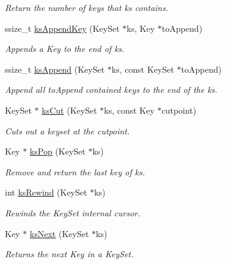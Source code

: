 \begin{DoxyCompactItemize}
\begin{DoxyCompactList}\small\item\em Return the number of keys that {\ttfamily ks} contains. \end{DoxyCompactList}\item 
ssize\+\_\+t \hyperlink{group__keyset_gaa5a1d467a4d71041edce68ea7748ce45}{ks\+Append\+Key} (Key\+Set $\ast$ks, Key $\ast$to\+Append)
\begin{DoxyCompactList}\small\item\em Appends a Key to the end of {\ttfamily ks}. \end{DoxyCompactList}\item 
ssize\+\_\+t \hyperlink{group__keyset_ga21eb9c3a14a604ee3a8bdc779232e7b7}{ks\+Append} (Key\+Set $\ast$ks, const Key\+Set $\ast$to\+Append)
\begin{DoxyCompactList}\small\item\em Append all {\ttfamily to\+Append} contained keys to the end of the {\ttfamily ks}. \end{DoxyCompactList}\item 
Key\+Set $\ast$ \hyperlink{group__keyset_ga6b00cf82b59af4d883a9bad6cf4a4a4a}{ks\+Cut} (Key\+Set $\ast$ks, const Key $\ast$cutpoint)
\begin{DoxyCompactList}\small\item\em Cuts out a keyset at the cutpoint. \end{DoxyCompactList}\item 
Key $\ast$ \hyperlink{group__keyset_gae42530b04defb772059de0600159cf69}{ks\+Pop} (Key\+Set $\ast$ks)
\begin{DoxyCompactList}\small\item\em Remove and return the last key of {\ttfamily ks}. \end{DoxyCompactList}\item 
int \hyperlink{group__keyset_gabe793ff51f1728e3429c84a8a9086b70}{ks\+Rewind} (Key\+Set $\ast$ks)
\begin{DoxyCompactList}\small\item\em Rewinds the Key\+Set internal cursor. \end{DoxyCompactList}\item 
Key $\ast$ \hyperlink{group__keyset_ga317321c9065b5a4b3e33fe1c399bcec9}{ks\+Next} (Key\+Set $\ast$ks)
\begin{DoxyCompactList}\small\item\em Returns the next Key in a Key\+Set. \end{DoxyCompactList}\item 

\end{DoxyCompactItemize}
